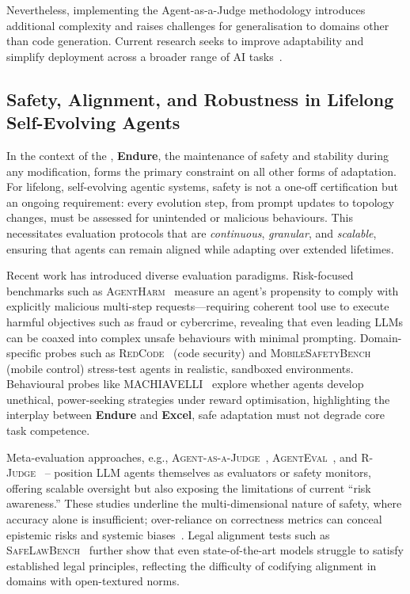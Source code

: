 Nevertheless, implementing the Agent-as-a-Judge methodology introduces additional complexity and raises challenges for generalisation to domains other than code generation. Current research seeks to improve adaptability and simplify deployment across a broader range of AI tasks~\citep{zhao2024auto,qian2025enhancing}.


\subsection{Safety, Alignment, and Robustness in Lifelong Self-Evolving Agents}
In the context of the \ThreeLaws{}, \textbf{Endure}, the maintenance of safety and stability during any modification, forms the primary constraint on all other forms of adaptation. For lifelong, self-evolving agentic systems, safety is not a one-off certification but an ongoing requirement: every evolution step, from prompt updates to topology changes, must be assessed for unintended or malicious behaviours. This necessitates evaluation protocols that are \emph{continuous}, \emph{granular}, and \emph{scalable}, ensuring that agents can remain aligned while adapting over extended lifetimes.

Recent work has introduced diverse evaluation paradigms. Risk-focused benchmarks such as \textsc{AgentHarm}~\citep{andriushchenko2024agentharm} measure an agent’s propensity to comply with explicitly malicious multi-step requests—requiring coherent tool use to execute harmful objectives such as fraud or cybercrime, revealing that even leading LLMs can be coaxed into complex unsafe behaviours with minimal prompting. Domain-specific probes such as \textsc{RedCode}~\citep{guo2024redcode} (code security) and \textsc{MobileSafetyBench}~\citep{lee2024mobilesafetybench} (mobile control) stress-test agents in realistic, sandboxed environments. Behavioural probes like \textsc{MACHIAVELLI}~\citep{pan2023rewards} explore whether agents develop unethical, power-seeking strategies under reward optimisation, highlighting the interplay between \textbf{Endure} and \textbf{Excel}, safe adaptation must not degrade core task competence.

Meta-evaluation approaches, e.g., \textsc{Agent-as-a-Judge}~\citep{zhuge2024agent}, \textsc{AgentEval}~\citep{arabzadeh2024towards}, and \textsc{R-Judge}~\citep{yuan2024r} -- position LLM agents themselves as evaluators or safety monitors, offering scalable oversight but also exposing the limitations of current “risk awareness.” These studies underline the multi-dimensional nature of safety, where accuracy alone is insufficient; over-reliance on correctness metrics can conceal epistemic risks and systemic biases~\citep{li2025accuracy}. Legal alignment tests such as \textsc{SafeLawBench}~\citep{cao_safelawbench_2025} further show that even state-of-the-art models struggle to satisfy established legal principles, reflecting the difficulty of codifying alignment in domains with open-textured norms.

